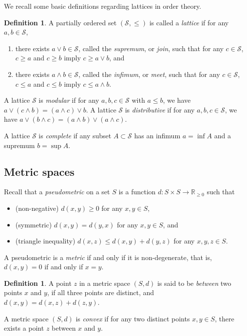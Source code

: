 \documentclass[11pt, leqno]{amsart}%
\theoremstyle{plain}
\theoremstyle{definition}
\newtheorem{definition}[theorem]{Definition}
\theoremstyle{remark}
\newcommand{\cS}{\mathcal{S}}
\newcommand{\bR}{\mathbb{R}}
\numberwithin{equation}{section}
\begin{document}
We recall some basic definitions regarding lattices in order theory.

\begin{definition}\label{defn:lattice}
    A partially ordered set $(\cS,\le)$ is called a \emph{lattice} if for any $a,b\in \cS$, 
    \begin{enumerate}
        \item there exists $a\vee b\in \cS$, called the \emph{supremum}, or \emph{join}, such that for any $c\in \cS$, $c\ge a$ and $c\ge b$ imply $c\ge a\vee b$, and
			
        \item there exists $a\wedge b\in\cS$, called the \emph{infimum}, or \emph{meet}, such that for any $c\in\cS$, $c\le a$ and $c\le b$ imply $c\le a\wedge b$.
		
    \end{enumerate}
	
    A lattice $\cS$ is \emph{modular} if for any $a,b,c\in\cS$ with $a\le b$, we have $a\vee (c\wedge b)=(a\wedge c)\vee b$. A lattice $\cS$ is \emph{distributive} if for any $a,b,c\in\cS$, we have $a\vee(b\wedge c)=(a\wedge b)\vee (a\wedge c)$.

    A lattice $\cS$ is \emph{complete} if any subset $A\subset \cS$ has an infimum $a=\inf A$ and a supremum $b=\sup A$.
\end{definition}
	

\subsection{Metric spaces}\label{ssec:metric spaces}

Recall that a \emph{pseudometric} on a set $S$ is a function $d:S\times S\to\bR_{\ge 0}$ such that 
\begin{itemize}
    \item (non-negative) $d(x,y)\ge 0$ for any $x,y\in S$,
	
    \item (symmetric) $d(x,y)=d(y,x)$ for any $x,y\in S$, and
	
    \item (triangle inequality) $d(x,z)\le d(x,y)+d(y,z)$ for any $x,y,z\in S$. 
\end{itemize}
A pseudometric is a \emph{metric} if and only if it is non-degenerate, that is, $d(x,y)=0$ if and only if $x=y$. 

\begin{definition}\label{defn:convex metric space}
    A point $z$ in a metric space $(S,d)$ is said to be \emph{between} two points $x$ and $y$, if all three points are distinct, and $d(x,y)=d(x,z)+d(z,y)$.
	
    A metric space $(S,d)$ is \emph{convex} if for any two distinct points $x,y\in S$, there exists a point $z$ between $x$ and $y$.
\end{definition}
\end{document}
